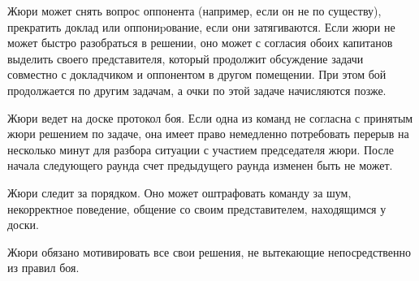\documentclass{article}
\begin{document}
Жюри может снять вопрос оппонента (например, если он не по существу), прекратить доклад или оппониpование, если они затягиваются. Если жюри не может быстро разобраться в решении, оно может с согласия обоих капитанов выделить своего представителя, который продолжит обсуждение задачи совместно с докладчиком и оппонентом в другом помещении. При этом бой продолжается по другим задачам, а очки по этой задаче начисляются позже.

Жюри ведет на доске протокол боя. Если одна из команд не согласна с принятым жюри решением по задаче, она имеет право немедленно потребовать перерыв на несколько минут для разбора ситуации с участием председателя жюри. После начала следующего раунда счет предыдущего раунда изменен быть не может.

Жюри следит за порядком. Оно может оштрафовать команду за шум, некорректное поведение, общение со своим представителем, находящимся у доски.

Жюри обязано мотивировать все свои решения, не вытекающие непосредственно из правил боя. 
\end{document}
